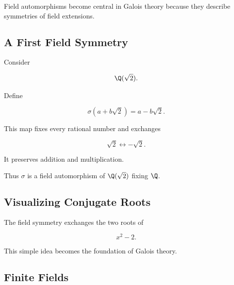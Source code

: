 Field automorphisms become central in Galois theory because they describe
symmetries of field extensions.

\subsection{A First Field Symmetry}
\label{subsec:first-field-symmetry}

Consider

\[ \Q(\sqrt2). \]

Define

\[ \sigma(a+b\sqrt2)=a-b\sqrt2. \]

This map fixes every rational number and exchanges

\[ \sqrt2\longleftrightarrow-\sqrt2. \]

It preserves addition and multiplication.

Thus \(\sigma\) is a field automorphism of \(\Q(\sqrt2)\) fixing \(\Q\).

\subsection{Visualizing Conjugate Roots}
\label{subsec:visual-conjugate-roots}

\begin{center}
\end{center}

The field symmetry exchanges the two roots of

\[ x^2-2. \]

This simple idea becomes the foundation of Galois theory.

\subsection{Finite Fields}
\label{subsec:finite-fields}

